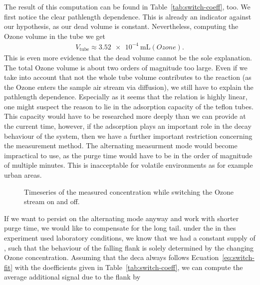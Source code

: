 The result of this computation can be found in
Table~\ref{tab:switch-coeff}, too. We first notice the clear
pathlength dependence. This is already an indicator against our
hypothesis, as our dead volume is constant. Nevertheless, computing
the Ozone volume in the tube we get
\begin{align*}
  V_{\text{tube}} \approx \SI{3.52e-4}{\milli\liter(Ozone)}.
\end{align*}
This is even more evidence that the dead volume cannot be the sole
explanation. The total Ozone volume is about two orders of magnitude
too large. Even if we take into account that not the whole tube volume
contributes to the reaction (as the Ozone enters the sample air stream
via diffusion), we still have to explain the pathlength
dependence. Especially as it seems that the relation is highly linear,
one might suspect the reason to lie in the adsorption capacity of the
teflon tubes. This capacity would have to be researched more deeply
than we can provide at the current time, however, if the adsorption
plays an important role in the decay behaviour of the system, then we
have a further important restriction concerning the measurement
method. The alternating measurment mode would become impractical to
use, as the purge time would have to be in the order of magnitude of
multiple minutes. This is inacceptable for volatile environments as
for example urban areas.

\begin{figure}[htbp]
  \centering
  
  \caption{Timeseries of the measured  concentration while
    switching the Ozone stream on and off.}
  \label{fig:switch}
\end{figure}
If we want to persist on the alternating mode anyway and work with
shorter purge time, we would like to compensate
for the long tail. under the in thes experiment used laboratory
conditions, we know that we had
a constant supply of , such that the behaviour of the falling
flank is solely determined by the changing Ozone concentration.
Assuming that the deca always follows Ecuation~\eqref{eq:switch-fit}
with the doefficients given in Table~\ref{tab:switch-coeff}, we can
compute the average additional  signal due to the flank by

